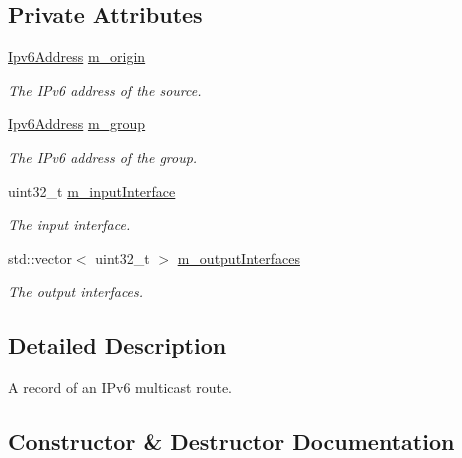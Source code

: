 \subsection*{Private Attributes}
\begin{DoxyCompactItemize}
\item 
\hyperlink{classns3_1_1Ipv6Address}{Ipv6\+Address} \hyperlink{classns3_1_1Ipv6MulticastRoutingTableEntry_adf39d1e8d1d5531f66793258131b6dc1}{m\+\_\+origin}
\begin{DoxyCompactList}\small\item\em The I\+Pv6 address of the source. \end{DoxyCompactList}\item 
\hyperlink{classns3_1_1Ipv6Address}{Ipv6\+Address} \hyperlink{classns3_1_1Ipv6MulticastRoutingTableEntry_adf2e6759d1de21cc570cb7dd850b1650}{m\+\_\+group}
\begin{DoxyCompactList}\small\item\em The I\+Pv6 address of the group. \end{DoxyCompactList}\item 
uint32\+\_\+t \hyperlink{classns3_1_1Ipv6MulticastRoutingTableEntry_a8e8435624d0596fd1e8fda6abc0e0d91}{m\+\_\+input\+Interface}
\begin{DoxyCompactList}\small\item\em The input interface. \end{DoxyCompactList}\item 
std\+::vector$<$ uint32\+\_\+t $>$ \hyperlink{classns3_1_1Ipv6MulticastRoutingTableEntry_acf08ac7c14676053f91726482c5c7a39}{m\+\_\+output\+Interfaces}
\begin{DoxyCompactList}\small\item\em The output interfaces. \end{DoxyCompactList}\end{DoxyCompactItemize}


\subsection{Detailed Description}
A record of an I\+Pv6 multicast route. 

\subsection{Constructor \& Destructor Documentation}
